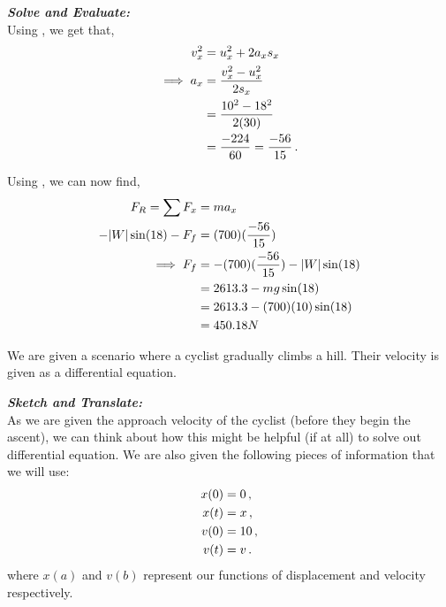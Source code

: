 \begin{subquestions}
\textbf{\textit{Solve and Evaluate:}} \\
Using , we get that,
\begin{align}
	v_x^2 & = u_x^2 + 2a_xs_x \nonumber \\
	\implies a_x & = \frac{v_x^2-u_x^2}{2s_x} \nonumber \\
	  & = \frac{10^2-18^2}{2(30)} \nonumber \\
	  & = \frac{-224}{60} = \frac{-56}{15} \,. 
\end{align}

Using , we can now find,
\begin{align}
	F_R = \sum F_x & = ma_x \nonumber \\
	      -|W|\sin(18) - F_f & = (700)(\frac{-56}{15}) \nonumber \\
	      \implies F_f & = -(700)(\frac{-56}{15})-|W|\sin(18) \nonumber \\
	                   & = 2613.3-mg\sin(18) \nonumber \\
	                   & = 2613.3-(700)(10)\sin(18) \nonumber \\
	                   & = 450.18N
\end{align}



\subquestion
We are given a scenario where a cyclist gradually climbs a hill. Their velocity is given as a differential equation.

\begin{subsubquestions}
	
\subsubquestion

\textbf{\textit{Sketch and Translate:}} \\
As we are given the approach velocity of the cyclist (before they begin the ascent), we can think about how this might be helpful (if at all) to solve out differential equation.
We are also given the following pieces of information that we will use: 
\begin{align}
	x(0) &= 0 \,,\nonumber \\
	x(t) &= x \,,\nonumber \\
	v(0) &= 10 \,,\nonumber \\
	v(t) &= v \,.
\end{align}
where $x(a)$ and $v(b)$ represent our functions of displacement and velocity respectively.\\
	

\end{subsubquestions}
\end{subquestions}
